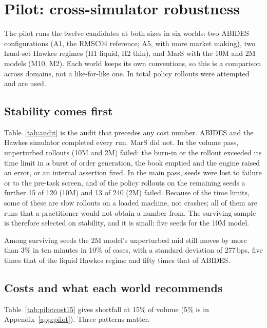 \section{Pilot: cross-simulator robustness}
\label{sec:pilot}

The pilot runs the twelve candidates at both sizes in six worlds: two ABIDES configurations (A1, the RMSC04 reference; A5, with more market making), two hand-set Hawkes regimes (H1 liquid, H2 thin), and MarS with the 10M and 2M models (M10, M2). Each world keeps its own conventions, so this is a comparison across domains, not a like-for-like one. In total \nPilotRows{} policy rollouts were attempted and \nPilotUsed{} are used.

\subsection{Stability comes first}



Table~\ref{tab:audit} is the audit that precedes any cost number. ABIDES and the Hawkes simulator completed every run. MarS did not. In the volume pass, \marsVolFail{} unperturbed rollouts (10M and 2M) failed: the burn-in or the rollout exceeded its time limit in a burst of order generation, the book emptied and the engine raised an error, or an internal assertion fired. In the main pass, \marsMainFail{} seeds were lost to failure or to the pre-task screen, and of the policy rollouts on the remaining seeds a further 15 of 120 (10M) and 13 of 240 (2M) failed. Because of the time limits, some of these are slow rollouts on a loaded machine, not crashes; all of them are runs that a practitioner would not obtain a number from. The surviving sample is therefore selected on stability, and it is small: five seeds for the 10M model.

Among surviving seeds the 2M model's unperturbed mid still moves by more than 3\% in ten minutes in 10\% of cases, with a standard deviation of 277\,bps, five times that of the liquid Hawkes regime and fifty times that of ABIDES.

\subsection{Costs and what each world recommends}



Table~\ref{tab:pilotcost15} gives shortfall at 15\% of volume (5\% is in Appendix~\ref{app:pilot}). Three patterns matter.

